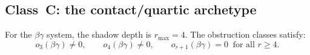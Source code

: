 \subsection{Class~C: the contact/quartic archetype}
\label{subsec:class-c-contact}

\begin{theorem}[$r_{\max}(\beta\gamma) = 4$;
\ClaimStatusProvedHere]
\label{thm:contact-rmax-four}
For the $\beta\gamma$ system, the shadow depth is
$r_{\max} = 4$. The obstruction classes satisfy:
\begin{equation}\label{eq:contact-obstruction-pattern}
o_3(\beta\gamma) \neq 0,
\qquad
o_4(\beta\gamma) \neq 0,
\qquad
o_{r+1}(\beta\gamma) = 0
\;\;\text{for all } r \geq 4.
\end{equation}
\end{theorem}

